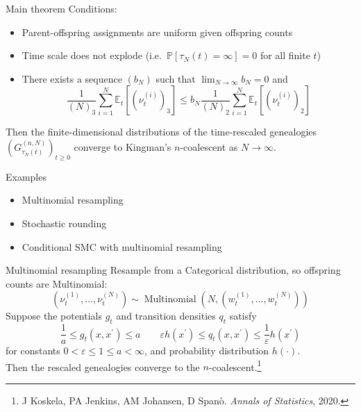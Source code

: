 \documentclass[aspectratio=169]{beamer}
\theoremstyle{definition}
\newcommand{\PR}{\mathbb{P}}
\newcommand{\E}{\mathbb{E}}
\newcommand{\Mn}{\operatorname{Multinomial}}
\newcommand{\vt}[2][t]{\nu_{#1}^{(#2)}}
\newcommand{\wt}[2][t]{w_{#1}^{(#2)}}
\begin{document}
\begin{frame}{Main theorem}
Conditions:
\begin{itemize}
\item Parent-offspring assignments are uniform given offspring counts
\item Time scale does not explode (i.e.\ $\PR[\tau_N(t)=\infty]=0$ for all finite $t$)
\item There exists a sequence $(b_N)$ such that $\lim_{N\to\infty} b_N = 0$ and
\begin{equation*}
\frac{1}{(N)_3} \sum_{i=1}^N \E_t [ (\vt{i})_3 ]
\leq b_N \frac{1}{(N)_2} \sum_{i=1}^N \E_t [ (\vt{i})_2 ]
\end{equation*}
\end{itemize}
Then the finite-dimensional distributions of the time-rescaled genealogies $\left( G_{\tau_N(t)}^{(n,N)} \right)_{t\geq0}$ converge to Kingman's $n$-coalescent as $N\to\infty$.
\end{frame}


\begin{frame}{Examples}
\begin{itemize}
\item Multinomial resampling
\item Stochastic rounding 
\item Conditional SMC with multinomial resampling
\end{itemize}
\end{frame}


\begin{frame}{Multinomial resampling}
Resample from a Categorical distribution, so offspring counts are Multinomial:
\begin{equation*}
(\vt{1} , \dots, \vt{N}) \sim \Mn \left( N, (\wt{1},\dots,\wt{N}) \right)
\end{equation*}
Suppose the potentials $g_t$ and transition densities $q_t$ satisfy
\begin{equation*}
\frac{1}{a} \leq g_t(x, x^\prime) \leq a \qquad
\varepsilon h(x^\prime) \leq q_t(x, x^\prime) \leq \frac{1}{\varepsilon} h(x^\prime) 
\end{equation*}
for constants $0<\varepsilon\leq 1\leq a<\infty$, and probability distribution $h(\cdot)$.\\[10pt]
Then the rescaled genealogies converge to the $n$-coalescent.\footnote{J Koskela, PA Jenkins, AM Johansen, D Span\`o. \textit{Annals of Statistics}, 2020.}
\end{frame}
\end{document}
